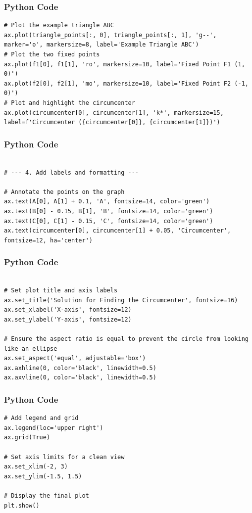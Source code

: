 \documentclass{beamer}
\begin{document}
\begin{frame}[fragile]
\frametitle{Python Code}
\begin{lstlisting}
# Plot the example triangle ABC
ax.plot(triangle_points[:, 0], triangle_points[:, 1], 'g--', marker='o', markersize=8, label='Example Triangle ABC')
# Plot the two fixed points
ax.plot(f1[0], f1[1], 'ro', markersize=10, label='Fixed Point F1 (1, 0)')
ax.plot(f2[0], f2[1], 'mo', markersize=10, label='Fixed Point F2 (-1, 0)')
# Plot and highlight the circumcenter
ax.plot(circumcenter[0], circumcenter[1], 'k*', markersize=15, label=f'Circumcenter ({circumcenter[0]}, {circumcenter[1]})')
\end{lstlisting}
\end{frame}

\begin{frame}[fragile]
\frametitle{Python Code}
\begin{lstlisting}

# --- 4. Add labels and formatting ---

# Annotate the points on the graph
ax.text(A[0], A[1] + 0.1, 'A', fontsize=14, color='green')
ax.text(B[0] - 0.15, B[1], 'B', fontsize=14, color='green')
ax.text(C[0], C[1] - 0.15, 'C', fontsize=14, color='green')
ax.text(circumcenter[0], circumcenter[1] + 0.05, 'Circumcenter', fontsize=12, ha='center')

\end{lstlisting}
\end{frame}

\begin{frame}[fragile]
\frametitle{Python Code}
\begin{lstlisting}

# Set plot title and axis labels
ax.set_title('Solution for Finding the Circumcenter', fontsize=16)
ax.set_xlabel('X-axis', fontsize=12)
ax.set_ylabel('Y-axis', fontsize=12)

# Ensure the aspect ratio is equal to prevent the circle from looking like an ellipse
ax.set_aspect('equal', adjustable='box')
ax.axhline(0, color='black', linewidth=0.5)
ax.axvline(0, color='black', linewidth=0.5)
\end{lstlisting}
\end{frame}

\begin{frame}[fragile]
\frametitle{Python Code}
\begin{lstlisting}
# Add legend and grid
ax.legend(loc='upper right')
ax.grid(True)

# Set axis limits for a clean view
ax.set_xlim(-2, 3)
ax.set_ylim(-1.5, 1.5)

# Display the final plot
plt.show()
\end{lstlisting}
\end{frame}
\end{document}
